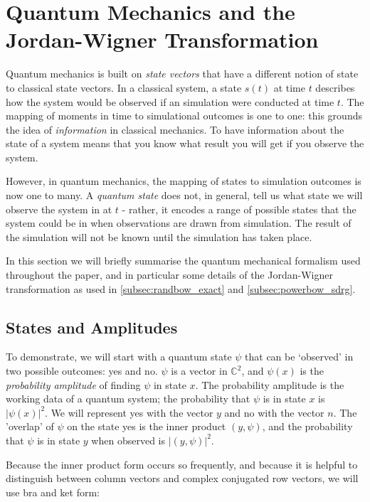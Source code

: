 
\section{Quantum Mechanics and the Jordan-Wigner Transformation}\label{sec:quantum}
Quantum mechanics is built on \textit{state vectors} that have a different notion of state to classical state vectors. In a classical system, a state $s(t)$ at time $t$ describes how the system would be observed if an simulation were conducted at time $t$. The mapping of moments in time to simulational outcomes is one to one: this grounds the idea of \textit{information} in classical mechanics. To have information about the state of a system means that you know what result you will get if you observe the system.

However, in quantum mechanics, the mapping of states to simulation outcomes is now one to many. A \textit{quantum state} does not, in general, tell us what state we will observe the system in at $t$ - rather, it encodes a range of possible states that the system could be in when observations are drawn from simulation. The result of the simulation will not be known until the simulation has taken place.

In this section we will briefly summarise the quantum mechanical formalism used throughout the paper, and in particular some details of the Jordan-Wigner transformation as used in \ref{subsec:randbow_exact} and \ref{subsec:powerbow_sdrg}.

\subsection{States and Amplitudes}\label{subsec:states}
To demonstrate, we will start with a quantum state $\psi$ that can be `observed' in two possible outcomes: yes and no. $\psi$ is a vector in $\mathbb{C}^2$, and $\psi(x)$ is the \textit{probability amplitude} of finding $\psi$ in state $x$. The probability amplitude is the working data of a quantum system; the probability that $\psi$ is in state $x$ is $|\psi(x)|^2$.
We will represent yes with the vector $y$ and no with the vector $n$. The 'overlap' of $\psi$ on the state yes is the inner product $(y, \psi)$, and the probability that $\psi$ is in state $y$ when observed is $|(y, \psi)|^2$. 

Because the inner product form occurs so frequently, and because it is helpful to distinguish between column vectors and complex conjugated row vectors, we will use bra and ket form: 

